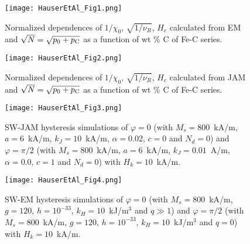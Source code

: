 \documentclass[../main.tex]{subfiles}
\begin{document}
\begin{figure}[h]
  \bc
  \texttt{[image: HauserEtAl\_Fig1.png]}
  \ec
  \caption{\label{FigureEM}
  Normalized dependences of $1/\chi_0$, $\sqrt{1/\nu_R}$, $H_c$ calculated from EM
  and $\sqrt{N}=\sqrt{p_0+p_{\rm C}}$ as a function of wt \% C of Fe-C series.}
\end{figure}

\begin{figure}[h]
  \bc
  \texttt{[image: HauserEtAl\_Fig2.png]}
  \ec
  \caption{\label{FigureJAM}
  Normalized dependences of $1/\chi_0$, $\sqrt{1/\nu_R}$, $H_c$ calculated from JAM
  and $\sqrt{N}=\sqrt{p_0+p_{\rm C}}$ as a function of wt \% C of Fe-C series.}
\end{figure}

\begin{figure}
  \bc
  \texttt{[image: HauserEtAl\_Fig3.png]}
  \ec
  \caption{\label{jmsw}
  SW-JAM hysteresis simulations of $\varphi=0$ 
  (with $M_s=800$~kA/m, $a=6$~kA/m, $k_J=10$~kA/m, $\alpha=0.02$, $c=0$ and $N_d=0$) and
  $\varphi=\pi/2$
  (with $M_s=800$~kA/m, $a=6$~kA/m, $k_J=0.01$~A/m, $\alpha=0.0$, $c=1$ and $N_d=0$)
  with $H_k=10$~kA/m. }
\end{figure}

\begin{figure}
  \bc
  \texttt{[image: HauserEtAl\_Fig4.png]}
  \ec
  \caption{\label{emsw}
  SW-EM hysteresis simulations of
  $\varphi=0$ (with $M_s=800$~kA/m, $g=120$, $h=10^{-33}$, $k_H=10$~kJ/m$^{3}$ and $q\gg1$) and
  $\varphi=\pi/2$ (with $M_s=800$~kA/m, $g=120$, $h=10^{-33}$, $k_H=10$~kJ/m$^{3}$ and $q=0$)
  with $H_k=10$~kA/m. }
\end{figure}

\cleardoublepage
\end{document}
